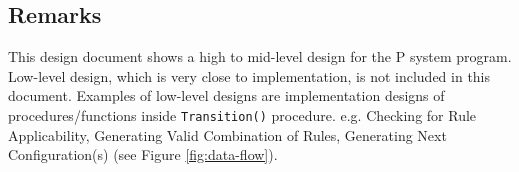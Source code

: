 \documentclass{article}
\begin{document}

\subsection{Remarks}

This design document shows a high to mid-level design for the P system program. Low-level design, 
which is very close to implementation, is not included in this document. Examples of low-level 
designs are implementation designs of procedures/functions inside \texttt{Transition()} procedure.
e.g. Checking for Rule Applicability, Generating Valid Combination of Rules, Generating Next
Configuration(s) (see Figure \ref{fig:data-flow}).
\end{document}
